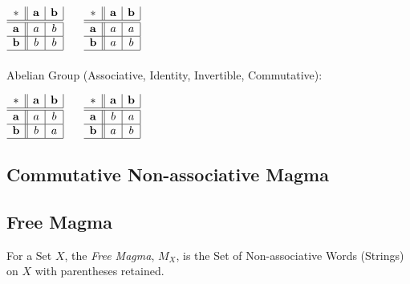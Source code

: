 $\begin{array}{c||c|c|}
  * & \mathbf{a} & \mathbf{b} \\ \hline \hline
  \mathbf{a} & a & b \\ \hline
  \mathbf{b} & b & b \\ \hline
\end{array}$ $\quad$ $\begin{array}{c||c|c|}
  * & \mathbf{a} & \mathbf{b} \\ \hline \hline
  \mathbf{a} & a & a \\ \hline
  \mathbf{b} & a & b \\ \hline
\end{array}$
\\ \\
Abelian Group (Associative, Identity, Invertible, Commutative):

$\begin{array}{c||c|c|}
  * & \mathbf{a} & \mathbf{b} \\ \hline \hline
  \mathbf{a} & a & b \\ \hline
  \mathbf{b} & b & a \\ \hline
\end{array}$ $\quad$ $\begin{array}{c||c|c|}
  * & \mathbf{a} & \mathbf{b} \\ \hline \hline
  \mathbf{a} & b & a \\ \hline
  \mathbf{b} & a & b \\ \hline
\end{array}$



\subsection{Commutative Non-associative Magma}\label{sec:commutative_magma}

\subsection{Free Magma}\label{sec:free_magma}

For a Set $X$, the \emph{Free Magma}, $M_X$, is the Set of
Non-associative Words (Strings) on $X$ with parentheses retained.


